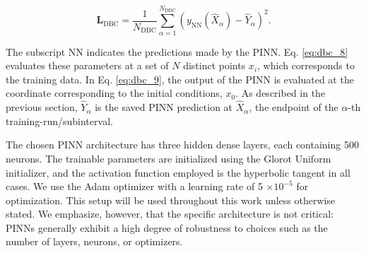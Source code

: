\begin{equation}\label{eq:dbc_10}
\mathbf{L}_{\mathrm{DBC}}=\frac{1}{N_{\mathrm{DBC}}}\sum_{\alpha=1}^{N_{\mathrm{DBC}}}\left(y_{\mathrm{NN}}(\hat{X}_\alpha)-\hat{Y}_\alpha\right)^2.
\end{equation}

The subscript NN indicates the predictions made by the PINN. Eq. \ref{eq:dbc_8} evaluates these parameters at a set of $N$ distinct points $x_i$, which corresponds to the training data. In Eq. \ref{eq:dbc_9}, the output of the PINN is evaluated at the coordinate corresponding to the initial conditions, $x_0$. As described in the previous section, $\hat{Y}_\alpha$ is the saved PINN prediction at $\hat{X}_\alpha$, the endpoint of the $\alpha$-th training-run/subinterval.


The chosen PINN architecture has three hidden dense layers, each containing 500 neurons. The trainable parameters are initialized using the Glorot Uniform initializer, and the activation function employed is the hyperbolic tangent in all cases. We use the Adam optimizer with a learning rate of 5 $\times 10^{-5}$ for optimization. This setup will be used throughout this work unless otherwise stated. We emphasize, however, that the specific architecture is not critical: PINNs generally exhibit a high degree of robustness to choices such as the number of layers, neurons, or optimizers.

